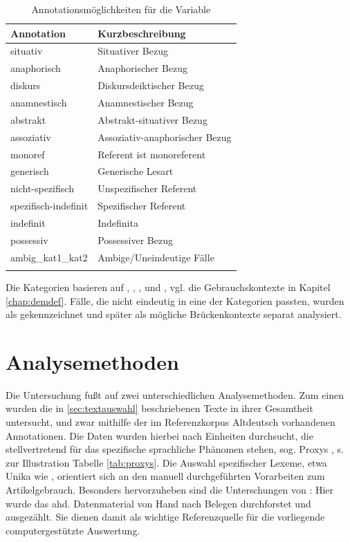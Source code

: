 \begin{table}
\centering
\begin{tabular}{ll}
\lsptoprule
Annotation & Kurzbeschreibung  \\ \midrule
situativ            & Situativer Bezug               \\
anaphorisch         & Anaphorischer Bezug            \\
diskurs             & Diskursdeiktischer Bezug      \\
anamnestisch        & Anamnestischer Bezug           \\
abstrakt            & Abstrakt-situativer Bezug      \\
assoziativ          & Assoziativ-anaphorischer Bezug \\
monoref             & Referent ist monoreferent      \\
generisch           & Generische Lesart              \\
nicht-spezifisch        & Unspezifischer Referent           \\
spezifisch-indefinit          & Spezifischer Referent           \\
indefinit           & Indefinita     \\
possessiv           & Possessiver Bezug    \\
ambig\_kat1\_kat2  & Ambige/Uneindeutige Fälle      \\ \lspbottomrule
\end{tabular}
\caption{Annotationsmöglichkeiten für die Variable \label{tab:definitheit}}
\end{table}

Die Kategorien basieren auf \textcite{Lobner1985}, \textcite{Himmelmann1996, Himmelmann1997},  \textcite{Diessel1999}, \textcite{Donhauser2012} und \textcite{Szczepaniak2011a}, vgl. die Gebrauchskontexte in Kapitel \ref{chap:demdef}. Fälle, die nicht eindeutig in eine der Kategorien passten, wurden als  gekennzeichnet und später als mögliche Brückenkontexte separat analysiert. 


\section{Analysemethoden} \label{sec:analysemethoden}

Die Untersuchung fußt auf zwei unterschiedlichen Analysemethoden. Zum einen wurden die in \ref{sec:textauswahl} beschriebenen Texte in ihrer Gesamtheit untersucht, und zwar mithilfe der im Referenzkorpus Altdeutsch vorhandenen Annotationen. Die Daten wurden hierbei nach Einheiten durchsucht, die stellvertretend für das spezifische sprachliche Phänomen stehen, sog. Proxys \parencite[vgl.][114]{Lemnitzer2015}, s. zur Illustration Tabelle \ref{tab:proxys}. Die Auswahl spezifischer Lexeme, etwa Unika wie  , orientiert sich an den manuell durchgeführten Vorarbeiten zum Artikelgebrauch. Besonders hervorzuheben sind die Unterschungen von \textcite{Graf1905,Bell1907,Hodler1954,Oubouzar1989}: Hier wurde das ahd. Datenmaterial von Hand nach Belegen durchforstet und ausgezählt. Sie dienen damit als wichtige Referenzquelle für die vorliegende computergestützte Auswertung. 

